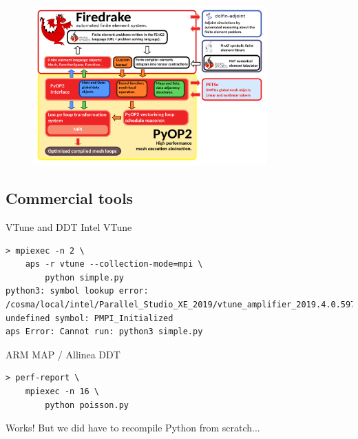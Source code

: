 \documentclass[pdf,aspectratio=169]{beamer}
\begin{document}
\begin{frame}
\begin{figure}
	\includegraphics[width=0.8\textwidth]{firedrake_diagram.pdf}
\end{figure}
\end{frame}

\subsection{Commercial tools}
\begin{frame}[fragile]{VTune and DDT}
Intel VTune
\begin{lstlisting}
> mpiexec -n 2 \
    aps -r vtune --collection-mode=mpi \
        python simple.py
python3: symbol lookup error: /cosma/local/intel/Parallel_Studio_XE_2019/vtune_amplifier_2019.4.0.597835/lib64/libmps.so: undefined symbol: PMPI_Initialized
aps Error: Cannot run: python3 simple.py
\end{lstlisting}

ARM MAP / Allinea DDT
\begin{lstlisting}
> perf-report \
    mpiexec -n 16 \
        python poisson.py
\end{lstlisting}
Works! But we did have to recompile Python from scratch...
\end{frame}
\end{document}
